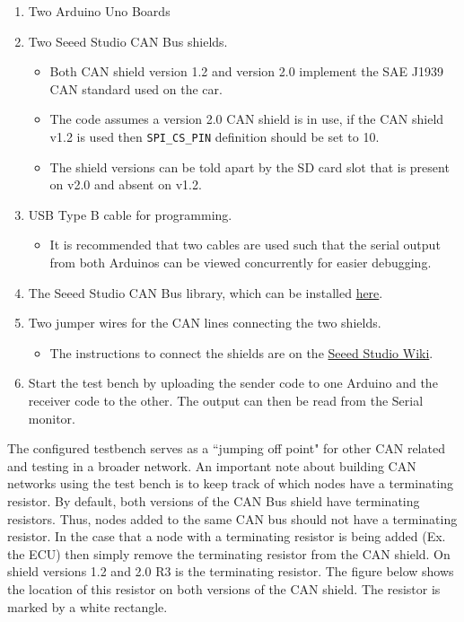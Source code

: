 \documentclass[letterpaper]{article}
\begin{document}
\begin{enumerate}
\item Two Arduino Uno Boards
\item Two Seeed Studio CAN Bus shields.
  \begin{itemize}
    \item Both CAN shield version 1.2 and version 2.0 implement the SAE J1939
      CAN standard used on the car.
    \item The code assumes a version 2.0 CAN shield is in use, if the CAN shield
      v1.2 is used then \lstinline{SPI_CS_PIN} definition should be set to 10.
    \item The shield versions can be told apart by the SD card slot that is
      present on v2.0 and absent on v1.2.
  \end{itemize}
\item USB Type B cable for programming.
  \begin{itemize}
    \item It is recommended that two cables are used such that the serial output
      from both Arduinos can be viewed concurrently for easier debugging.
  \end{itemize}
\item The Seeed Studio CAN Bus library, which can be installed
  \href{https://github.com/Seeed-Studio/CAN_BUS_Shield}{here}.
\item Two jumper wires for the CAN lines connecting the two shields.
  \begin{itemize}
    \item The instructions to connect the shields are on the
      \href{http://wiki.seeedstudio.com/CAN-BUS_Shield_V2.0/}{Seeed Studio Wiki}.
  \end{itemize}
\item Start the test bench by uploading the sender code to one Arduino and the
  receiver code to the other. The output can then be read from the Serial
  monitor.
\end{enumerate}

The configured testbench serves as a ``jumping off point" for other CAN related
and testing in a broader network. An important note about building CAN networks
using the test bench is to keep track of which nodes have a terminating
resistor. By default, both versions of the CAN Bus shield have terminating
resistors. Thus, nodes added to the same CAN bus should not have a terminating
resistor. In the case that a node with a terminating resistor is being added
(Ex. the ECU) then simply remove the terminating resistor from the CAN shield.
On shield versions 1.2 and 2.0 R3 is the terminating resistor. The figure below
shows the location of this resistor on both versions of the CAN shield. The
resistor is marked by a white rectangle.
\end{document}
